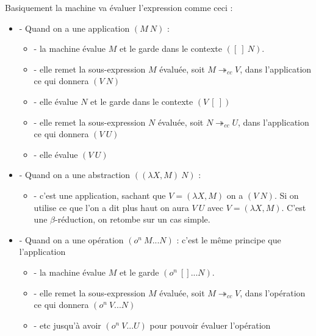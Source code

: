 \documentclass[10pt,a4paper]{report}
\begin{document}
	
	Basiquement la machine va évaluer l'expression comme ceci :
	\begin{itemize}
		\item[] - Quand on a une application $(M~N)$ :
		\begin{itemize}
			\item[] - la machine évalue $M$ et le garde dans le contexte $([~]~N)$.
			\item[] - elle remet la sous-expression $M$ évaluée, soit $M \twoheadrightarrow_{cc} V$, dans l'application ce qui donnera $(V~N)$
			\item[] - elle évalue $N$ et le garde dans le contexte $(V~[~])$ 
			\item[] - elle remet la sous-expression $N$ évaluée, soit $N \twoheadrightarrow_{cc} U$, dans l'application ce qui donnera $(V~U)$
			\item[] - elle évalue $(V~U)$ 
		\end{itemize}
		\item[] - Quand on a une abstraction $((\lambda X,M)~N)$ : 
		\begin{itemize}
			\item[] - c'est une application, sachant que $V = (\lambda X,M)$ on a $(V~N)$. Si on utilise ce que l'on a dit plus haut on aura $V~U$ avec  $V = (\lambda X,M)$. C'est une $\beta$-réduction, on retombe sur un cas simple.
		\end{itemize}
		\item[] - Quand on a une opération $(o^{n}~M...N)$ : c'est le même principe que l'application
		\begin{itemize}
			\item[] - la machine évalue $M$ et le garde $(o^{n}~[]...N)$.
			\item[] - elle remet la sous-expression $M$ évaluée, soit $M \twoheadrightarrow_{cc} V$, dans l'opération ce qui donnera $(o^{n}~V...N)$
			\item[] - etc jusqu'à avoir $(o^{n}~V...U)$ pour pouvoir évaluer l'opération
		\end{itemize}
	\end{itemize}
	\bigbreak
	
\end{document}
